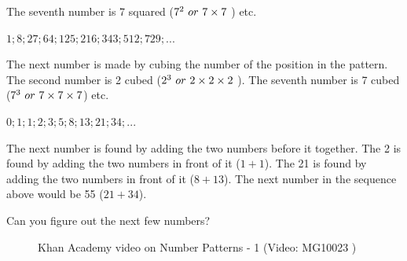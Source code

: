 The seventh number is 7 squared (${7}^{2}\phantom{\rule{3.33333pt}{0ex}}or\phantom{\rule{3.33333pt}{0ex}}7\ensuremath{\times}7$  \hspace{1ex} ) etc.\par 
        \label{m39364*uid12}
            \nopagebreak
          \label{m39364*id63115}
            $1;8;27;64;125;216;343;512;729;...$
          \par 
          \label{m39364*id63168}The next number is made by cubing the number of the position in the pattern.
The second number is 2 cubed (${2}^{3}\phantom{\rule{3.33333pt}{0ex}}or\phantom{\rule{3.33333pt}{0ex}}2\ensuremath{\times}2\ensuremath{\times}2$ \hspace{1ex}).
The seventh number is 7 cubed (${7}^{3}\phantom{\rule{3.33333pt}{0ex}}or\phantom{\rule{3.33333pt}{0ex}}7\ensuremath{\times}7\ensuremath{\times}7$\hspace{2ex}) etc.\par 
        \label{m39364*uid13}
            \nopagebreak
          \label{m39364*id63254}
            $0;1;1;2;3;5;8;13;21;34;...$
          \par 
          \label{m39364*id63490}The next number is found by adding the two numbers before it together.
The 2 is found by adding the two numbers in front of it ($1+1$).
The 21 is found by adding the two numbers in front of it ($8+13$).
The next number in the sequence above would be 55 ($21+34$).\par 
          \label{m39364*id63538}Can you figure out the next few numbers?\par 
\label{m39364*eip-450}
    \setcounter{subfigure}{0}
	\begin{figure}[H] %
    \textnormal{Khan Academy video on Number Patterns - 1}\vspace{.1in} \nopagebreak
  \label{m39364*yt-media1}\label{m39364*yt-video1}
             { (Video:  MG10023 )}
      \vspace{2pt}
    \vspace{.1in}
 \end{figure}       \par \label{m39364*secfhsst!!!underscore!!!id280}\vspace{.5cm} 
